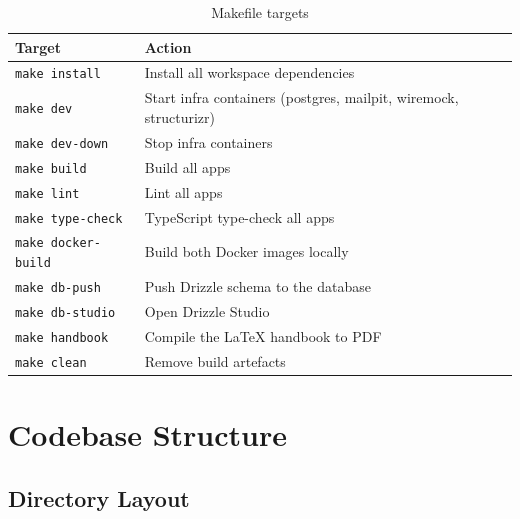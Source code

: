\documentclass[12pt,a4paper,twoside]{report}
\newcommand{\code}[1]{\texttt{#1}}
\begin{document}
\begin{table}[H]
  \centering
  \caption{Makefile targets}
  \begin{tabular}{@{}ll@{}}
    \toprule
    \textbf{Target} & \textbf{Action} \\
    \midrule
    \code{make install}      & Install all workspace dependencies \\
    \code{make dev}          & Start infra containers (postgres, mailpit, wiremock, structurizr) \\
    \code{make dev-down}     & Stop infra containers \\
    \code{make build}        & Build all apps \\
    \code{make lint}         & Lint all apps \\
    \code{make type-check}   & TypeScript type-check all apps \\
    \code{make docker-build} & Build both Docker images locally \\
    \code{make db-push}      & Push Drizzle schema to the database \\
    \code{make db-studio}    & Open Drizzle Studio \\
    \code{make handbook}         & Compile the LaTeX handbook to PDF \\
    \code{make clean}        & Remove build artefacts \\
    \bottomrule
  \end{tabular}
\end{table}

\chapter{Codebase Structure}
\label{ch:codebase}

\section{Directory Layout}
\end{document}
